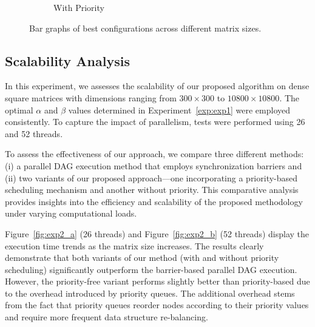\begin{figure}
\begin{subfigure}{\linewidth}
        \caption{With Priority}
        \label{fig:exp1_bar_b}
    \end{subfigure}
    
    \caption{Bar graphs of best configurations across different matrix sizes.}
    \label{fig:exp1_bar}
\end{figure}

\subsection{Scalability Analysis}\label{exp:exp2}
In this experiment, we assesses the scalability of our proposed algorithm on dense square matrices with dimensions ranging from $300 \times 300$ to $10800 \times 10800$. The optimal $\alpha$ and $\beta$ values determined in Experiment~\ref{exp:exp1} were employed consistently. To capture the impact of parallelism, tests were performed using 26 and 52 threads.

To assess the effectiveness of our approach, we compare three different methods: (i) a parallel DAG execution method that employs synchronization barriers and (ii) two variants of our proposed approach—one incorporating a priority-based scheduling mechanism and another without priority. This comparative analysis provides insights into the efficiency and scalability of the proposed methodology under varying computational loads.

Figure~\ref{fig:exp2_a} (26 threads) and Figure~\ref{fig:exp2_b} (52 threads) display the execution time trends as the matrix size increases. The results clearly demonstrate that both variants of our method (with and without priority scheduling) significantly outperform the barrier-based parallel DAG execution. However, the priority-free variant performs slightly better than priority-based due to the overhead introduced by priority queues. The additional overhead stems from the fact that priority queues reorder nodes according to their priority values and require more frequent data structure re-balancing.

